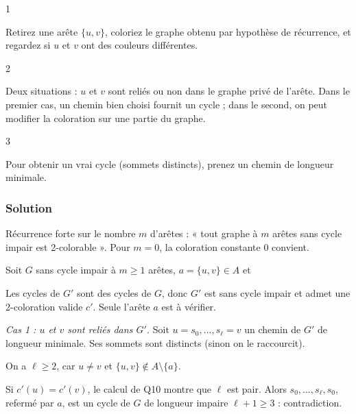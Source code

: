 \documentclass[11pt,a4paper]{article}
\newcommand{\equationajustee}[1]{%
  \sbox{\boiteequation}{$\displaystyle #1$}%
  \ifdim\wd\boiteequation>\linewidth
    \[\resizebox{\linewidth}{!}{\usebox{\boiteequation}}\]%
  \else
    \[#1\]%
  \fi}
\begin{document}
\begin{indication}{1}

Retirez une arête \(\{u, v\}\), coloriez le graphe obtenu par hypothèse de récurrence, et regardez si \(u\) et \(v\) ont des couleurs différentes.

\end{indication}

\begin{indication}{2}

Deux situations : \(u\) et \(v\) sont reliés ou non dans le graphe privé de l'arête. Dans le premier cas, un chemin bien choisi fournit un cycle ; dans le second, on peut modifier la coloration sur une partie du graphe.

\end{indication}

\begin{indication}{3}

Pour obtenir un vrai cycle (sommets distincts), prenez un chemin de longueur minimale.

\end{indication}

\hypertarget{solution-10}{%
\subsubsection{Solution}\label{solution-10}}

Récurrence forte sur le nombre \(m\) d'arêtes : « tout graphe à \(m\) arêtes sans cycle impair est 2-colorable ». Pour \(m = 0\), la coloration constante \(0\) convient.

Soit \(G\) sans cycle impair à \(m \ge 1\) arêtes, \(a = \{u, v\} \in A\) et

\equationajustee{G' = (S, A \setminus \{a\}).}

Les cycles de \(G'\) sont des cycles de \(G\), donc \(G'\) est sans cycle impair et admet une 2-coloration valide \(c'\). Seule l'arête \(a\) est à vérifier.

\emph{Cas 1 : \(u\) et \(v\) sont reliés dans \(G'\).} Soit \(u = s_0, \dots, s_\ell = v\) un chemin de \(G'\) de longueur minimale. Ses sommets sont distincts (sinon on le raccourcit).

On a \(\ell \ge 2\), car \(u \neq v\) et \(\{u, v\} \notin A \setminus \{a\}\).

Si \(c'(u) = c'(v)\), le calcul de Q10 montre que \(\ell\) est pair. Alors \(s_0, \dots, s_\ell, s_0\), refermé par \(a\), est un cycle de \(G\) de longueur impaire \(\ell + 1 \ge 3\) : contradiction.
\end{document}
